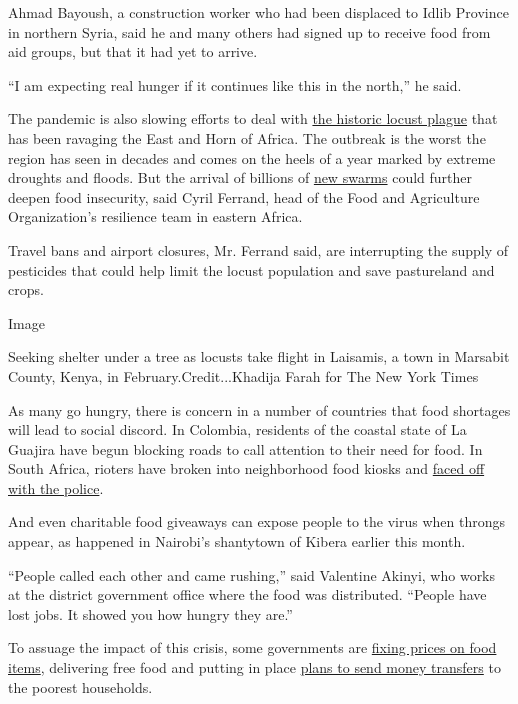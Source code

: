 Ahmad Bayoush, a construction worker who had been displaced to Idlib
Province in northern Syria, said he and many others had signed up to
receive food from aid groups, but that it had yet to arrive.

``I am expecting real hunger if it continues like this in the north,''
he said.

The pandemic is also slowing efforts to deal with
\href{https://www.nytimes.com/2020/02/21/world/africa/locusts-kenya-east-africa.html}{the
historic locust plague} that has been ravaging the East and Horn of
Africa. The outbreak is the worst the region has seen in decades and
comes on the heels of a year marked by extreme droughts and floods. But
the arrival of billions of
\href{http://www.fao.org/ag/locusts/en/info/info/index.html}{new swarms}
could further deepen food insecurity, said Cyril Ferrand, head of the
Food and Agriculture Organization's resilience team in eastern Africa.

Travel bans and airport closures, Mr. Ferrand said, are interrupting the
supply of pesticides that could help limit the locust population and
save pastureland and crops.

Image

Seeking shelter under a tree as locusts take flight in Laisamis, a town
in Marsabit County, Kenya, in February.Credit...Khadija Farah for The
New York Times

As many go hungry, there is concern in a number of countries that food
shortages will lead to social discord. In Colombia, residents of the
coastal state of La Guajira have begun blocking roads to call attention
to their need for food. In South Africa, rioters have broken into
neighborhood food kiosks and
\href{https://www.amnesty.org/en/latest/news/2020/04/southern-africa-government-intervention-required-as-millions-face-hunger-under-covid19-lockdown-regimes/}{faced
off with the police}.

And even charitable food giveaways can expose people to the virus when
throngs appear, as happened in Nairobi's shantytown of Kibera earlier
this month.

``People called each other and came rushing,'' said Valentine Akinyi,
who works at the district government office where the food was
distributed. ``People have lost jobs. It showed you how hungry they
are.''

To assuage the impact of this crisis, some governments are
\href{https://twitter.com/RwandaTrade/status/1241672944461451264}{fixing
prices on food items}, delivering free food and putting in place
\href{https://www.president.go.ke/2020/03/25/presidential-address-on-the-state-interventions-to-cushion-kenyans-against-economic-effects-of-covid-19-pandemic-on-25th-march-2020/}{plans
to send money transfers} to the poorest households.

